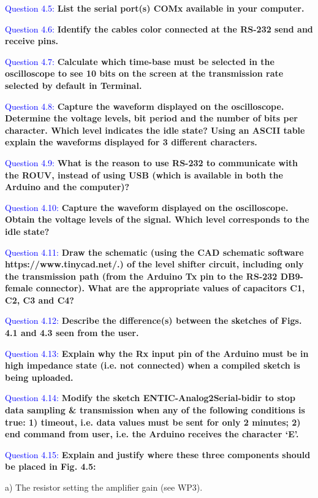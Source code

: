 \documentclass[12pt, a4papre]{article}
\begin{document}
	\textcolor{blue}{Question 4.5:}  \textbf{List the serial port(s) COMx available in your computer. }

	\textcolor{blue}{Question 4.6:}  \textbf{Identify the cables color connected at the RS-232 send and receive pins.}

	\textcolor{blue}{Question 4.7:}  \textbf{Calculate which time-base must be selected in the oscilloscope to see 10 bits on the screen at the transmission rate selected by default in Terminal. }

	\textcolor{blue}{Question 4.8:} \textbf{Capture the waveform displayed on the oscilloscope. Determine the voltage levels, bit period and the number of bits per character. Which level indicates the idle state? Using an ASCII table explain the waveforms displayed for 3 different characters.}

	\textcolor{blue}{Question 4.9:} \textbf{What is the reason to use RS-232 to communicate with the ROUV, instead of using USB (which is available in both the Arduino and the computer)?}

	\textcolor{blue}{Question 4.10:} \textbf{Capture the waveform displayed on the oscilloscope. Obtain the voltage levels of the signal. Which level corresponds to the idle state?}

	\textcolor{blue}{Question 4.11:} \textbf{Draw the schematic (using the CAD schematic software https://www.tinycad.net/.) of the level shifter circuit, including only the transmission path (from the Arduino Tx pin to the RS-232 DB9-female connector). What are the appropriate values of capacitors C1, C2, C3 and C4?}

	\textcolor{blue}{Question 4.12:} \textbf{Describe the difference(s) between the sketches of Figs. 4.1 and 4.3 seen from the user.}

	\textcolor{blue}{Question 4.13:} \textbf{Explain why the Rx input pin of the Arduino must be in high impedance state (i.e. not connected) when a compiled sketch is being uploaded. }

	\textcolor{blue}{Question 4.14:} \textbf{Modify the sketch ENTIC-Analog2Serial-bidir to stop data sampling \& transmission when any of the following conditions is true: 1) timeout, i.e. data values must be sent for only 2 minutes; 2) end command from user, i.e. the Arduino receives the character ‘E’.  }


	\textcolor{blue}{Question 4.15:} \textbf{Explain and justify where these three components should be placed in Fig. 4.5: }
	
	a)  The resistor setting the amplifier gain (see WP3).
	
\end{document}

